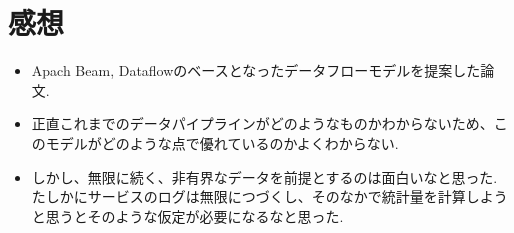 \documentclass[dvipdfmx,uplatex]{jsarticle}
\theoremstyle{remark}
\newenvironment{experiment}[1]{
    \begin{tcolorbox}[
        colframe=violet,
        colback=violet!10!white,
        colbacktitle=violet!40!white,
        coltitle=black,
        fonttitle=\bfseries,
        title={#1}
    ]
}{
    \end{tcolorbox}
}
\newenvironment{kansou}{
    \begin{tcolorbox}[
        colframe=brown,
        colback=brown!10!white,
        colbacktitle=brown!40!white,
        coltitle=black,fonttitle=\bfseries
    ]
}{
    \end{tcolorbox}
}
\begin{document}


\section{感想}
\begin{kansou}
\begin{itemize}
  \item Apach Beam, Dataflowのベースとなったデータフローモデルを提案した論文.
  \item 正直これまでのデータパイプラインがどのようなものかわからないため、このモデルがどのような点で優れているのかよくわからない.
  \item しかし、無限に続く、非有界なデータを前提とするのは面白いなと思った. たしかにサービスのログは無限につづくし、そのなかで統計量を計算しようと思うとそのような仮定が必要になるなと思った.
\end{itemize}
\end{kansou}




\end{document}
